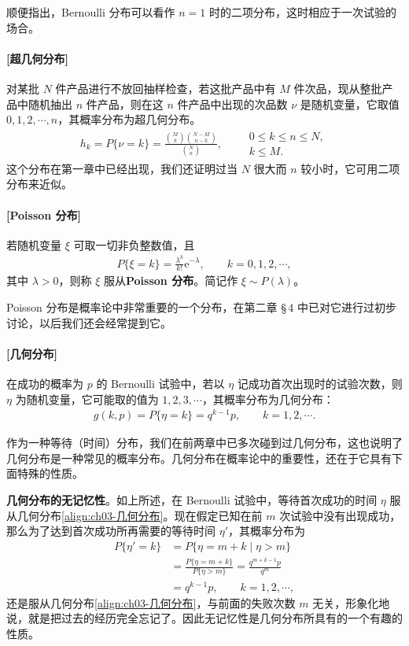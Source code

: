 \documentclass[../../main.tex]{subfiles}
\begin{document}
顺便指出，Bernoulli 分布可以看作 $n=1$ 时的二项分布，这时相应于一次试验的场合。

\paragraph{[超几何分布]}对某批 $N$ 件产品进行不放回抽样检查，若这批产品中有 $M$ 件次品，现从整批产品中随机抽出 $n$ 件产品，则在这 $n$ 件产品中出现的次品数 $\nu$ 是随机变量，它取值 $0,1,2,\cdots,n$，其概率分布为超几何分布。
\begin{align}
h_k=P\{\nu=k\}=\frac{\binom{M}{k}\binom{N-M}{n-k}}{\binom{N}{n}},\qquad
\begin{array}{l}
0\leqslant k\leqslant n\leqslant N,\\
k\leqslant M.
\end{array}\label{align:ch03-超几何分布}
\end{align}
这个分布在第一章中已经出现，我们还证明过当 $N$ 很大而 $n$ 较小时，它可用二项分布来近似。

\paragraph{[Poisson 分布]}若随机变量 $\xi$ 可取一切非负整数值，且
\begin{align}
P\{\xi=k\}=\frac{\lambda^{k}}{k!}\mathrm{e}^{-\lambda},\qquad k=0,1,2,\cdots,\label{align:ch03-poisson分布}
\end{align}
其中 $\lambda>0$，则称 $\xi$ 服从\textbf{Poisson 分布}。简记作 $\xi\sim P(\lambda)$。

Poisson 分布是概率论中非常重要的一个分布，在第二章 \S\,4 中已对它进行过初步讨论，以后我们还会经常提到它。

\paragraph{[几何分布]}在成功的概率为 $p$ 的 Bernoulli 试验中，若以 $\eta$ 记成功首次出现时的试验次数，则 $\eta$ 为随机变量，它可能取的值为 $1,2,3,\cdots$，其概率分布为几何分布：
\begin{align}
g(k,p)=P\{\eta=k\}=q^{k-1}p,\qquad k=1,2,\cdots.\label{align:ch03-几何分布}
\end{align}

作为一种等待（时间）分布，我们在前两章中已多次碰到过几何分布，这也说明了几何分布是一种常见的概率分布。几何分布在概率论中的重要性，还在于它具有下面特殊的性质。

\textbf{几何分布的无记忆性}。如上所述，在 Bernoulli 试验中，等待首次成功的时间 $\eta$ 服从几何分布\eqref{align:ch03-几何分布}。现在假定已知在前 $m$ 次试验中没有出现成功，那么为了达到首次成功所再需要的等待时间 $\eta'$，其概率分布为
\begin{align*}
P\{\eta'=k\}&=P\{\eta=m+k\mid\eta>m\}\\
&=\frac{P\{\eta=m+k\}}{P\{\eta>m\}}=\frac{q^{m+k-1}p}{q^{m}}\\
&=q^{k-1}p,\qquad k=1,2,\cdots,
\end{align*}
还是服从几何分布\eqref{align:ch03-几何分布}，与前面的失败次数 $m$ 无关，形象化地说，就是把过去的经历完全忘记了。因此无记忆性是几何分布所具有的一个有趣的性质。
\end{document}
